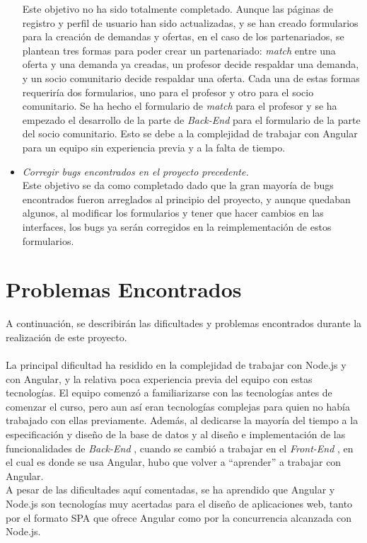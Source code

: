 \documentclass[11pt]{book}
\begin{document}
\begin{itemize}
		Este objetivo no ha sido totalmente completado. Aunque las páginas de registro y perfil de usuario han sido actualizadas, y se han creado formularios para la creación de demandas y ofertas, en el caso de los partenariados, se plantean tres formas para poder crear un partenariado: \emph{match} entre una oferta y una demanda ya creadas, un profesor decide respaldar una demanda, y un socio comunitario decide respaldar una oferta. Cada una de estas formas requeriría dos formularios, uno para el profesor y otro para el socio comunitario. Se ha hecho el formulario de \emph{match} para el profesor y se ha empezado el desarrollo de la parte de \emph{ Back-End } para el formulario de la parte del socio comunitario. Esto se debe a la complejidad de trabajar con Angular para un equipo sin experiencia previa y a la falta de tiempo.
		\item \emph{Corregir bugs encontrados en el proyecto precedente.}\\
		Este objetivo se da como completado dado que la gran mayoría de bugs encontrados fueron arreglados al principio del proyecto, y aunque quedaban algunos, al modificar los formularios y tener que hacer cambios en las interfaces, los bugs ya serán corregidos en la reimplementación de estos formularios.
		
	\end{itemize}
	
	\section{Problemas Encontrados}
	A continuación, se describirán las dificultades y problemas encontrados durante la realización de este proyecto. \\\\
	La principal dificultad ha residido en la complejidad de trabajar con Node.js y con Angular, y la relativa poca experiencia previa del equipo con estas tecnologías. El equipo comenzó a familiarizarse con las tecnologías antes de comenzar el curso, pero aun así eran tecnologías complejas para quien no había trabajado con ellas previamente. Además, al dedicarse la mayoría del tiempo a la especificación y diseño de la base de datos y al diseño e implementación de las funcionalidades de \emph{ Back-End }, cuando se cambió a trabajar en el \emph{ Front-End }, en el cual es donde se usa Angular, hubo que volver a ``aprender'' a trabajar con Angular.\\
	A pesar de las dificultades aquí comentadas, se ha aprendido que Angular y Node.js son tecnologías muy acertadas para el diseño de aplicaciones web, tanto por el formato SPA que ofrece Angular como por la concurrencia alcanzada con Node.js.
	
\end{document}
